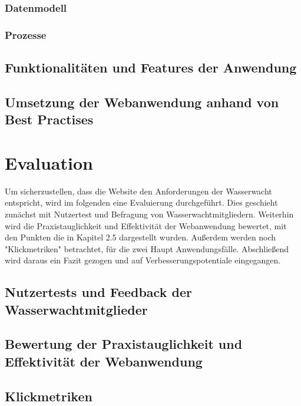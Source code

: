 \documentclass[fontsize=12pt,openright,oneside,paper=a4,BCOR=1cm]{scrbook}
\begin{document}
\subsection{Datenmodell}
\subsection{Prozesse}

\section{Funktionalitäten und Features der Anwendung}

\section{Umsetzung der Webanwendung anhand von Best Practises}


%
%

\renewcommand{\cleardoublepage}{}
\chapter{Evaluation}

Um sicherzustellen, dass die Website den Anforderungen der Wasserwacht entspricht, wird im folgenden eine Evaluierung durchgeführt. Dies geschieht zunächst mit Nutzertest und Befragung von Wasserwachtmitgliedern. Weiterhin wird die Praxistauglichkeit und Effektivität der Webanwendung bewertet, mit den Punkten die in Kapitel 2.5 dargestellt wurden. Außerdem werden noch "Klickmetriken" betrachtet, für die zwei Haupt Anwendungsfälle. Abschließend wird daraus ein Fazit gezogen und auf Verbesserungspotentiale eingegangen. 

\section{Nutzertests und Feedback der Wasserwachtmitglieder}

\section{Bewertung der Praxistauglichkeit und Effektivität der Webanwendung}


\section{Klickmetriken}
\end{document}
